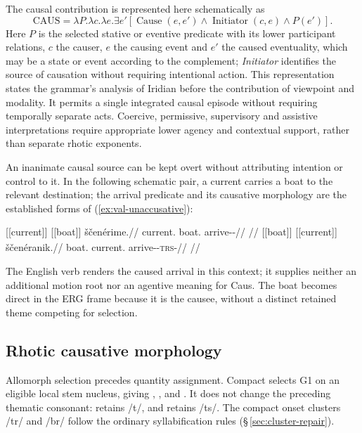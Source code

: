 The causal contribution is represented here schematically as
\[
 \mathrm{CAUS}
 =\lambda P.\lambda c.\lambda e.\exists e'
 [\operatorname{Cause}(e,e')\land\operatorname{Initiator}(c,e)
 \land P(e')].
\]
Here $P$ is the selected stative or eventive predicate with its lower
participant relations, $c$ the causer, $e$ the causing event and $e'$ the
caused eventuality, which may be a state or event according to the complement;
\emph{Initiator} identifies the source of causation without requiring
intentional action. This representation states the grammar's analysis of
Iridian before the contribution of viewpoint and modality. It permits a
single integrated causal episode without requiring temporally separate
acts. Coercive, permissive, supervisory and assistive interpretations require
appropriate lower agency and contextual support, rather than separate
rhotic exponents.


An inanimate causal source can be kept overt without attributing intention
or control to it. In the following schematic pair, a current carries a boat
to the relevant destination; the arrival predicate and its causative
morphology are the established forms of (\ref{ex:val-unaccusative}):

\pex\label{ex:val-slot-inanimate-cause}
\a
\begingl
\gla \textnormal{[[current]]}\textsubscript{\Dir{}} \textnormal{[[boat]]}\textsubscript{\Ind{}} ščenérime.//
\glb current.\Dir{} boat.\Ind{} arrive-\Caus{}-\Prog{}//
\glft {}
//
\endgl
\a
\begingl
\gla \textnormal{[[boat]]}\textsubscript{\Dir{}} \textnormal{[[current]]}\textsubscript{\Trs{}} ščenéranik.//
\glb boat.\Dir{} current.\Trs{} arrive-\Caus{}-\textsc{trs}-\Pf{}//
\glft {}
//
\endgl
\xe

The English verb  renders the caused arrival in this context;
it supplies neither an additional motion root nor an agentive meaning for
Caus. The boat becomes direct in the ERG frame because it is the causee,
without a distinct retained theme competing for selection.

\subsection{Rhotic causative morphology}
\label{sec:causative-grades}

Allomorph selection precedes quantity assignment. Compact 
selects G1 on an eligible local stem nucleus, giving ,
, and . It does not change the preceding
thematic consonant:  retains /t/, and
 retains /ts/. The compact onset clusters /tr/ and /br/
follow the ordinary syllabification rules
(§\,\ref{sec:cluster-repair}).

